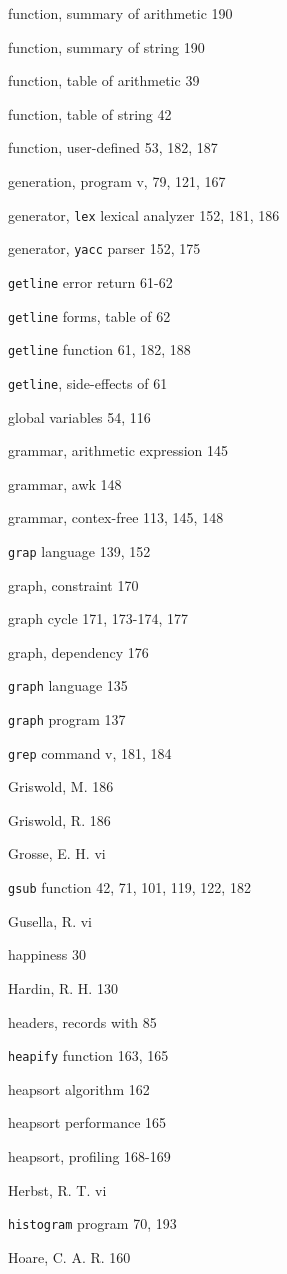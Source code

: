 \begin{multicols}{2}
function, summary of arithmetic 190

function, summary of string 190

function, table of arithmetic 39

function, table of string 42

function, user-defined 53, 182, 187

generation, program v, 79, 121, 167

generator, \verb'lex' lexical analyzer 152, 181, 186

generator, \verb'yacc' parser 152, 175

\verb'getline' error return 61-62

\verb'getline' forms, table of 62

\verb'getline' function 61, 182, 188

\verb'getline', side-effects of 61

global variables 54, 116

grammar, arithmetic expression 145

grammar, awk 148

grammar, contex-free 113, 145, 148

\verb'grap' language 139, 152

graph, constraint 170

graph cycle 171, 173-174, 177

graph, dependency 176

\verb'graph' language 135

\verb'graph' program 137

\verb'grep' command v, 181, 184

Griswold, M. 186

Griswold, R. 186

Grosse, E. H. vi

\verb'gsub' function 42, 71, 101, 119, 122, 182

Gusella, R. vi

happiness 30

Hardin, R. H. 130

headers, records with 85

\verb'heapify' function 163, 165

heapsort algorithm 162

heapsort performance 165

heapsort, profiling 168-169

Herbst, R. T. vi

\verb'histogram' program 70, 193

Hoare, C. A. R. 160


\end{multicols}
